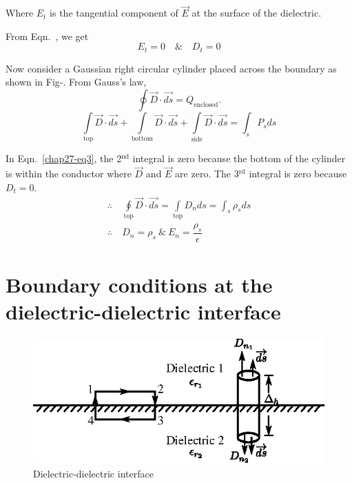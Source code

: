 Where $E_{t}$ is the tangential component of $\overrightarrow{E}$ at the surface of the dielectric. 

From Eqn.~\label{chap27-eq2}, we get 
$$
E_{t} = 0\quad \text{\&}\quad D_{t} = 0
$$

Now consider a Gaussian right circular cylinder placed across the boundary as shown in Fig-. From Gauss's law, 
$$
\oint \overrightarrow{D} \cdot \overrightarrow{ds} = Q_{\text{enclosed}}.
$$
\begin{equation}
\int\limits_{\text{top}} \overrightarrow{D} \cdot \overrightarrow{ds} + \int\limits_{\text{bottom}} \overrightarrow{D} \cdot \overrightarrow{ds} + \int\limits_{\text{side}} \overrightarrow{D} \cdot \overrightarrow{ds} = \int_{s} P_{s}ds\label{chap27-eq3}
\end{equation}

In Eqn.~\eqref{chap27-eq3}, the 2$^{\text{nd}}$ integral is zero because the bottom of the cylinder is within the conductor where $\overrightarrow{D}$ and $\overrightarrow{E}$ are zero. The 3$^{\text{rd}}$ integral is zero because $D_{t} = 0$. 
\begin{align*}
\therefore \ & \oint\limits_{\text{top}} \overrightarrow{D} \cdot \overrightarrow{ds} = \int\limits_{\text{top}} D_{n}ds = \int_{s} \rho_{s}ds\\
\therefore \ & D_{n} = \rho_{s} ~\&~ E_{n} = \dfrac{\rho_{s}}{\epsilon}
\end{align*}

\section{Boundary conditions at the dielectric-dielectric interface}\label{chap27-sec2}
\begin{figure}[H]
\centering
\includegraphics[scale=1.1]{images/fig2.eps}
\caption{Dielectric-dielectric interface}\label{chap27-fig2}
\end{figure}


